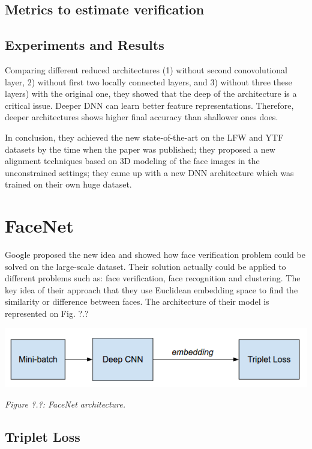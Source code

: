 \documentclass[paper=a4, fontsize=11pt]{scrartcl} %
\numberwithin{equation}{section} %
\numberwithin{figure}{section} %
\numberwithin{table}{section} %
\begin{document}
\subsection{Metrics to estimate verification}

\subsection{Experiments and Results}
Comparing different reduced architectures (1) without second conovolutional layer, 2) without first two locally connected layers, and 3) without three these layers) with the original one, they showed that the deep of the architecture is a critical issue. Deeper DNN can learn better feature representations. Therefore, deeper architectures shows higher final accuracy than shallower ones does. \par
In conclusion, they achieved the new state-of-the-art on the LFW and YTF datasets by the time when the paper was published; they proposed a new alignment techniques based on 3D modeling of the face images in the unconstrained settings; they came up with a new DNN architecture which was trained on their own huge dataset.

\section{FaceNet}

Google proposed the new idea \cite{schroff2015facenet} and showed how face verification problem could be solved on the large-scale dataset. Their solution actually could be applied to different problems such as: face verification, face recognition and clustering. The key idea of their approach that they use Euclidean embedding space to find the similarity or difference between faces. The architecture of their model is represented on Fig. ?.?

\begin{center}
\includegraphics[scale=0.5]{pictures/arch_facenet.png}
\par\large\textit{Figure ?.?: FaceNet architecture.}
\end{center}

\subsection{Triplet Loss} 
\end{document}
